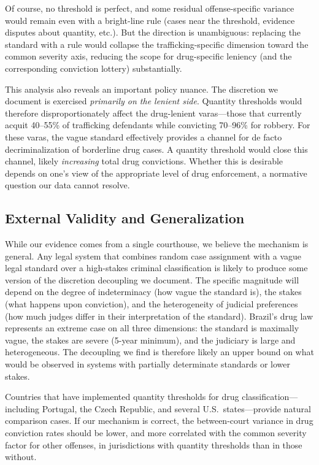 \documentclass[12pt]{article}
\begin{document}
Of course, no threshold is perfect, and some residual offense-specific variance would remain even with a bright-line rule (cases near the threshold, evidence disputes about quantity, etc.). But the direction is unambiguous: replacing the standard with a rule would collapse the trafficking-specific dimension toward the common severity axis, reducing the scope for drug-specific leniency (and the corresponding conviction lottery) substantially.

This analysis also reveals an important policy nuance. The discretion we document is exercised \textit{primarily on the lenient side}. Quantity thresholds would therefore disproportionately affect the drug-lenient varas---those that currently acquit 40--55\% of trafficking defendants while convicting 70--96\% for robbery. For these varas, the vague standard effectively provides a channel for de facto decriminalization of borderline drug cases. A quantity threshold would close this channel, likely \textit{increasing} total drug convictions. Whether this is desirable depends on one's view of the appropriate level of drug enforcement, a normative question our data cannot resolve.

\subsection{External Validity and Generalization}

While our evidence comes from a single courthouse, we believe the mechanism is general. Any legal system that combines random case assignment with a vague legal standard over a high-stakes criminal classification is likely to produce some version of the discretion decoupling we document. The specific magnitude will depend on the degree of indeterminacy (how vague the standard is), the stakes (what happens upon conviction), and the heterogeneity of judicial preferences (how much judges differ in their interpretation of the standard). Brazil's drug law represents an extreme case on all three dimensions: the standard is maximally vague, the stakes are severe (5-year minimum), and the judiciary is large and heterogeneous. The decoupling we find is therefore likely an upper bound on what would be observed in systems with partially determinate standards or lower stakes.

Countries that have implemented quantity thresholds for drug classification---including Portugal, the Czech Republic, and several U.S.\ states---provide natural comparison cases. If our mechanism is correct, the between-court variance in drug conviction rates should be lower, and more correlated with the common severity factor for other offenses, in jurisdictions with quantity thresholds than in those without.
\end{document}
